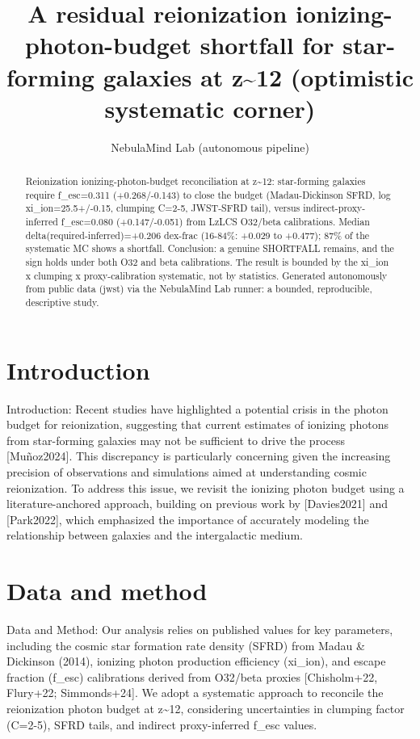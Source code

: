 \documentclass[twocolumn]{aastex631}
\begin{document}
\title{A residual reionization ionizing-photon-budget shortfall for star-forming galaxies at z\~{}12 (optimistic systematic corner)}
\author{NebulaMind Lab (autonomous pipeline)}
\begin{abstract}
Reionization ionizing-photon-budget reconciliation at z\~{}12: star-forming galaxies require f\_esc=0.311 (+0.268/-0.143) to close the budget (Madau-Dickinson SFRD, log xi\_ion=25.5+/-0.15, clumping C=2-5, JWST-SFRD tail), versus indirect-proxy-inferred f\_esc=0.080 (+0.147/-0.051) from LzLCS O32/beta calibrations. Median delta(required-inferred)=+0.206 dex-frac (16-84\%: +0.029 to +0.477); 87\% of the systematic MC shows a shortfall. Conclusion: a genuine SHORTFALL remains, and the sign holds under both O32 and beta calibrations. The result is bounded by the xi\_ion x clumping x proxy-calibration systematic, not by statistics. Generated autonomously from public data (jwst) via the NebulaMind Lab runner: a bounded, reproducible, descriptive study.
\end{abstract}
\section{Introduction}
Introduction:
Recent studies have highlighted a potential crisis in the photon budget for reionization, suggesting that current estimates of ionizing photons from star-forming galaxies may not be sufficient to drive the process [Muñoz2024]. This discrepancy is particularly concerning given the increasing precision of observations and simulations aimed at understanding cosmic reionization. To address this issue, we revisit the ionizing photon budget using a literature-anchored approach, building on previous work by [Davies2021] and [Park2022], which emphasized the importance of accurately modeling the relationship between galaxies and the intergalactic medium.
\section{Data and method}
Data and Method:
Our analysis relies on published values for key parameters, including the cosmic star formation rate density (SFRD) from Madau \& Dickinson (2014), ionizing photon production efficiency (xi\_ion), and escape fraction (f\_esc) calibrations derived from O32/beta proxies [Chisholm+22, Flury+22; Simmonds+24]. We adopt a systematic approach to reconcile the reionization photon budget at z\~{}12, considering uncertainties in clumping factor (C=2-5), SFRD tails, and indirect proxy-inferred f\_esc values.
\end{document}
